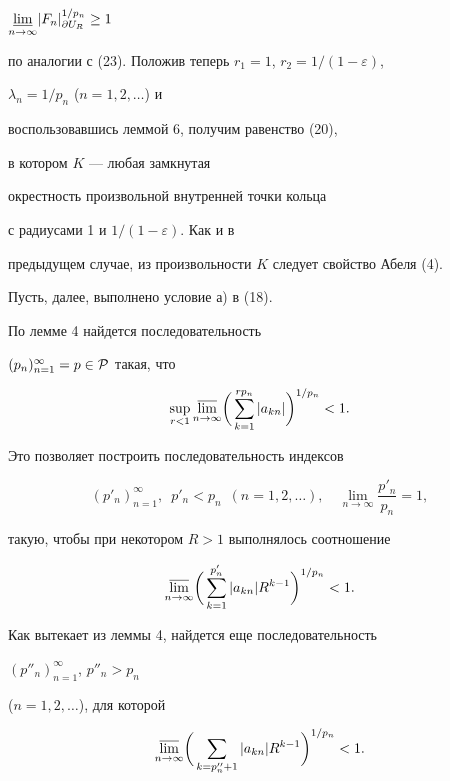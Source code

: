 $\underset{n\to\infty}{\varliminf}{}|F_n|^{1/p_n}_{\partial U_R}\ge1$ 


по аналогии с (23). Положив теперь $r_1=1$, $r_2=1/(1-\varepsilon)$, 


$\lambda_n=1/p_n$ ($n=1,2,\dotsc$) и 


воспользовавшись леммой 6, получим равенство (20), 


в котором $K$ --- любая замкнутая 


окрестность произвольной внутренней точки кольца 


с радиусами 1 и $1/(1-\varepsilon)$. Как и в 


предыдущем случае, из произвольности $K$ следует свойство Абеля (4). 


 


Пусть, далее, выполнено условие а) в (18). 


По лемме 4 найдется последовательность 


$(p_n)^\infty_{n=1}=p\in\cal P$ такая, что 


$$ 


\sup_{r<1}\underset{n\to\infty}{\varlimsup}{}\bigg( 


\sum^{r p_n}_{k=1}|a_{kn}|\bigg)^{1/p_n}<1. 


$$ 


Это позволяет построить последовательность индексов 


\begin{equation} 


(p'_n)^\infty_{n=1},\ \; p'_n<p_n\ \; (n=1,2,\dotsc), 


\quad\lim_{n\to\infty}\frac{p'_n}{p_n}=1, 


\end{equation} 


такую, чтобы при некотором $R>1$ выполнялось соотношение 


\begin{equation} 


\underset{n\to\infty}{\varlimsup}{}\bigg( 


\sum^{p'_n}_{k=1}|a_{kn}|R^{k-1}\bigg)^{1/p_n}<1. 


\end{equation} 


Как вытекает из леммы 4, найдется еще последовательность 


$(p''_n)^\infty_{n=1}$, $p''_n>p_n$ 


($n=1,2,\dotsc$), для которой 


\begin{equation} 


\underset{n\to\infty}{\varlimsup}{}\bigg( 


\sum_{k=p''_n+1}|a_{kn}|R^{k-1}\bigg)^{1/p_n}<1. 


\end{equation} 


